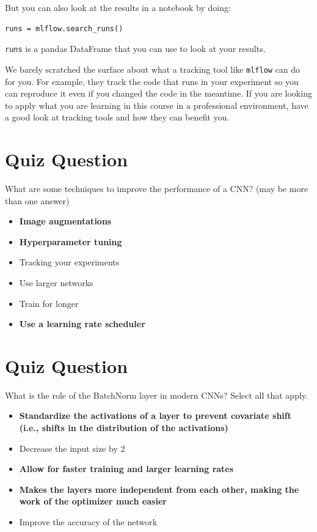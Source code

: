 But you can also look at the results in a notebook by doing:
\begin{lstlisting}
runs = mlflow.search_runs()
\end{lstlisting}
\lstinline{runs} is a pandas DataFrame that you can use to look at your results. \newline

We barely scratched the surface about what a tracking tool like \lstinline{mlflow} can do for you. For example, they track the code that runs in your experiment so you can reproduce it even if you changed the code in the meantime. If you are looking to apply what you are learning in this course in a professional environment, have a good look at tracking tools and how they can benefit you.

\section{Quiz Question}

What are some techniques to improve the performance of a CNN? (may be more than one answer)
\begin{itemize}
    \item \textbf{Image augmentations}
    \item \textbf{Hyperparameter tuning}
    \item Tracking your experiments
    \item Use larger networks
    \item Train for longer
    \item \textbf{Use a learning rate scheduler}
\end{itemize}

\section{Quiz Question}

What is the role of the BatchNorm layer in modern CNNs? Select all that apply.
\begin{itemize}
    \item \textbf{Standardize the activations of a layer to prevent covariate shift (i.e., shifts in the distribution of the activations)}
    \item Decrease the input size by 2
    \item \textbf{Allow for faster training and larger learning rates}
    \item \textbf{Makes the layers more independent from each other, making the work of the optimizer much easier}
    \item Improve the accuracy of the network
\end{itemize}

